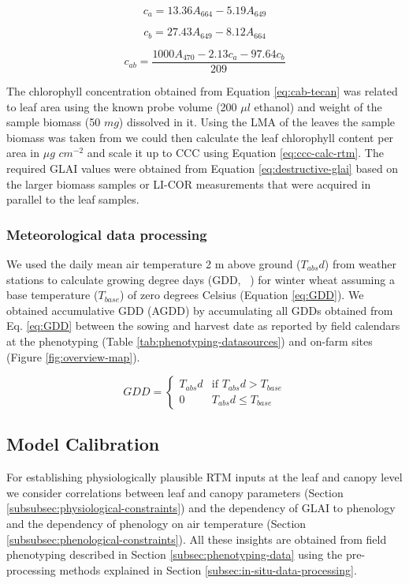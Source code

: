 \begin{equation}
    c_a = 13.36 A_{664} - 5.19 A_{649}
\end{equation}

\begin{equation}
    c_b = 27.43 A_{649} - 8.12 A_{664}
\end{equation}

\begin{equation}
    c_{ab} = \frac{1000 A_{470} - 2.13 c_a - 97.64 c_b}{209}
    \label{eq:cab-tecan}
\end{equation}

The chlorophyll concentration obtained from Equation \ref{eq:cab-tecan} was related to leaf area using the known probe volume (200 $\mu l$ ethanol) and weight of the sample biomass (50 $mg$) dissolved in it. Using the LMA of the leaves the sample biomass was taken from we could then calculate the leaf chlorophyll content per area in $\mu g$ $cm^{-2}$ and scale it up to \gls{CCC} using Equation \ref{eq:ccc-calc-rtm}. The required \gls{GLAI} values were obtained from Equation \ref{eq:destructive-glai} based on the larger biomass samples or LI-COR measurements that were acquired in parallel to the leaf samples.

\subsubsection{Meteorological data processing}
\label{subsubsec:meteo-data-processing}

We used the daily mean air temperature 2 m above ground ($T_{abs}d$) from weather stations to calculate growing degree days (GDD, ~\cite{mcmaster_growing_1997}) for winter wheat assuming a base temperature ($T_{base}$) of zero degrees Celsius (Equation \ref{eq:GDD}). We obtained accumulative GDD (AGDD) by accumulating all GDDs obtained from Eq. \ref{eq:GDD} between the sowing and harvest date as reported by field calendars at the phenotyping (Table \ref{tab:phenotyping-datasources}) and on-farm sites (Figure \ref{fig:overview-map}).

\begin{equation}
\label{eq:GDD}
    GDD =
    \begin{cases}
        T_{abs}d & \text{if } T_{abs}d > T_{base} \\
        0 &  T_{abs}d \le T_{base}
    \end{cases}
\end{equation}

\subsection{Model Calibration}
\label{subsec:model-calibration}
For establishing physiologically plausible \gls{RTM} inputs at the leaf and canopy level we consider correlations between leaf and canopy parameters (Section \ref{subsubsec:physiological-constraints}) and the dependency of \gls{GLAI} to phenology and the dependency of phenology on air temperature (Section \ref{subsubsec:phenological-constraints}). All these insights are obtained from field phenotyping described in Section \ref{subsec:phenotyping-data} using the pre-processing methods explained in Section \ref{subsec:in-situ-data-processing}.

